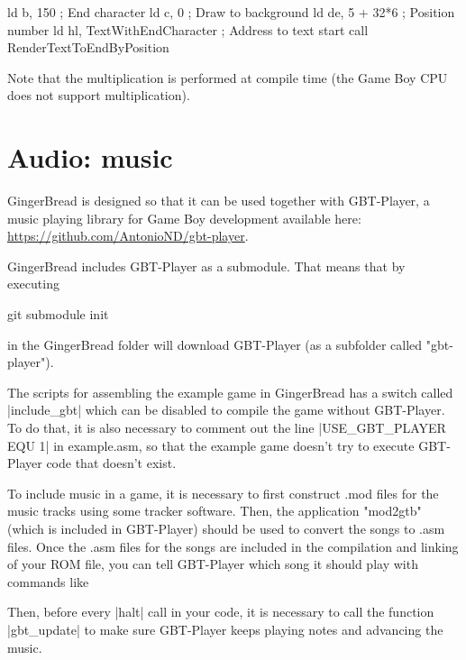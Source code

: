 \documentclass[11pt]{book}
\begin{document}
\begin{code}
ld b, 150 ; End character
ld c, 0 ; Draw to background
ld de, 5 + 32*6 ; Position number
ld hl, TextWithEndCharacter ; Address to text start
call RenderTextToEndByPosition
\end{code}

Note that the multiplication is performed at compile time (the Game Boy CPU does not support multiplication).


\section{Audio: music}
\label{music}
GingerBread is designed so that it can be used together with GBT-Player, a music playing library for Game Boy development available here: \url{https://github.com/AntonioND/gbt-player}.

GingerBread includes GBT-Player as a submodule. That means that by executing

\begin{code} 
git submodule init
\end{code}

in the GingerBread folder will download GBT-Player (as a subfolder called "gbt-player"). 

The scripts for assembling the example game in GingerBread has a switch called |include_gbt| which can be disabled to compile the game without GBT-Player. To do that, it is also necessary to comment out the line |USE_GBT_PLAYER EQU 1| in example.asm, so that the example game doesn't try to execute GBT-Player code that doesn't exist.

To include music in a game, it is necessary to first construct .mod files for the music tracks using some tracker software. Then, the application "mod2gtb" (which is included in GBT-Player) should be used to convert the songs to .asm files. Once the .asm files for the songs are included in the compilation and linking of your ROM file,  you can tell GBT-Player which song it should play with commands like


Then, before every |halt| call in your code, it is necessary to call the function |gbt_update| to make sure GBT-Player keeps playing notes and advancing the music.
\end{document}
